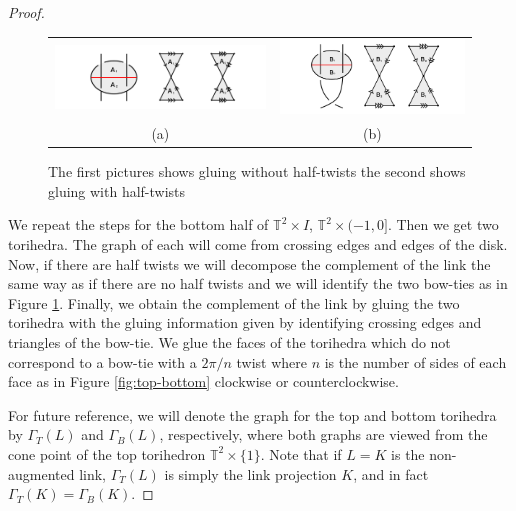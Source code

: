 \documentclass[11pt]{amsart}
\newcommand{\torus}{{\mathbb{T}^2}}
\theoremstyle{plain}
\theoremstyle{definition}
\begin{document}
\begin{proof}
\begin{figure}
 \centering
 \begin{tabular}{cc}
 \includegraphics [width=8cm]{falGluing1}&
 \includegraphics [width=7cm]{falGluing2}\\
 (a)&(b)
 \end{tabular}
 \caption{The first pictures shows gluing without half-twists the second shows gluing with half-twists}
 \label{fig:falGluings}
 \end{figure}

\indent We repeat the steps for the bottom half of $\torus \times I$, $\torus \times
(-1,0]$. Then we get two torihedra. The graph of each will come from
crossing edges and edges of the disk. Now, if there are half twists we will
decompose the complement of the link the same way as if there are no half twists
and we will identify the two bow-ties as in Figure \ref{fig:falGluings}.
Finally,
we obtain the complement of the link by gluing the two torihedra with the gluing
information given by identifying crossing edges and triangles of the bow-tie. We
glue the faces of the torihedra which do not correspond to a bow-tie with a
$2\pi/n$ twist where $n$ is the number of sides of each face as in Figure
\ref{fig:top-bottom} clockwise or counterclockwise.


For future reference, we will denote the graph for the top and bottom
torihedra by $\Gamma_T(L)$ and $\Gamma_B(L)$, respectively,
where both graphs are viewed from the cone point of the top torihedron
$\torus \times \{1\}$.
Note that if $L = K$ is the non-augmented link,
$\Gamma_T(L)$ is simply the link projection $K$,
and in fact $\Gamma_T(K) = \Gamma_B(K)$.

\end{proof}
\end{document}
